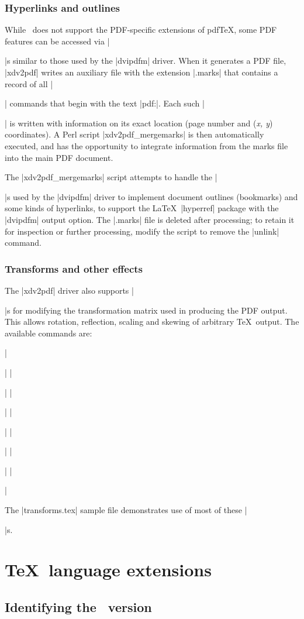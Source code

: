 \subsubsection{Hyperlinks and outlines}

While \XeTeX\ does not support the PDF-specific extensions of pdf\TeX, some PDF features can be accessed via |\special|s similar to those used by the |dvipdfm| driver. When it generates a PDF file, |xdv2pdf| writes an auxiliary file with the extension |.marks| that contains a record of all |\special| commands that begin with the text |pdf:|. Each such |\special| is written with information on its exact location (page number and ({\em x, y}) coordinates). A Perl script |xdv2pdf_mergemarks| is then automatically executed, and has the opportunity to integrate information from the marks file into the main PDF document.

The |xdv2pdf_mergemarks| script attempts to handle the |\special|s used by the |dvipdfm| driver to implement document outlines (bookmarks) and some kinds of hyperlinks, to support the \LaTeX\ |hyperref| package with the |dvipdfm| output option. The |.marks| file is deleted after processing; to retain it for inspection or further processing, modify the script to remove the |unlink| command.

\subsubsection{Transforms and other effects}

The |xdv2pdf| driver also supports |\special|s for modifying the transformation matrix used in producing the PDF output. This allows rotation, reflection, scaling and skewing of arbitrary \TeX\ output. The available commands are:
{\obeylines \parskip0pt \parindent
	||
	||
	||
	||
	||
	||
	||\par}\noindent
The |transforms.tex| sample file demonstrates use of most of these |\special|s.

\section{\TeX\ language extensions}

\subsection[Identifying the XeTeX version]{Identifying the \XeTeX\ version}

